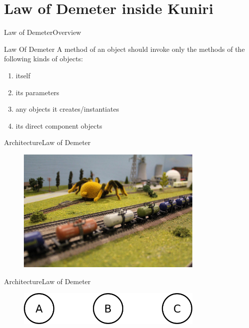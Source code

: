 \documentclass[10pt]{beamer}
\begin{document}

\section{Law of Demeter inside Kuniri}
\begin{frame}{Law of Demeter}{Overview}
\begin{block}{Law Of Demeter}
A method of an object should invoke only the methods of the following kinds of
objects:
  \begin{enumerate}
    \item itself
    \item its parameters
    \item any objects it creates/instantiates
    \item its direct component objects
  \end{enumerate}
\end{block}
\end{frame}

\begin{frame}{Architecture}{Law of Demeter}
  \begin{figure}[Look at class structure]
    \includegraphics[width=0.8\textwidth]{images/demeter_train.jpg}
  \end{figure}
\end{frame}

\begin{frame}{Architecture}{Law of Demeter}
  \begin{figure}[Look at class structure]
    \includegraphics[width=0.8\textwidth]{images/demeter_1.png}
  \end{figure}
\end{frame}
\end{document}
